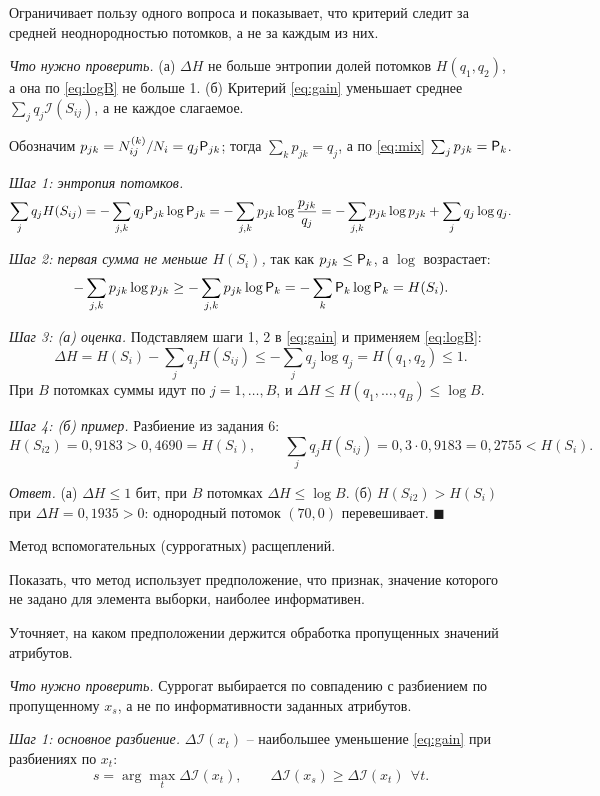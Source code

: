 \documentclass[12pt,a4paper]{article}
\begin{document}
\zachem Ограничивает пользу одного вопроса и показывает, что критерий следит за
средней неоднородностью потомков, а не за каждым из них.

\resh \emph{Что нужно проверить.} (а) $\Delta H$ не больше энтропии долей потомков
$H(q_1, q_2)$, а она по \eqref{eq:logB} не больше 1. (б) Критерий \eqref{eq:gain}
уменьшает среднее $\sum_j q_j\mathcal{I}(S_{ij})$, а не каждое слагаемое.

Обозначим $p_{jk} = N_{ij}^{(k)}/N_i = q_j\mathsf{P}_{jk}$; тогда $\sum_k p_{jk} = q_j$, а по
\eqref{eq:mix} $\sum_j p_{jk} = \mathsf{P}_k$.

\emph{Шаг 1: энтропия потомков.}
\[
  \sum_j q_jH(S_{ij}) = -\sum_{j,k} q_j\mathsf{P}_{jk}\log\mathsf{P}_{jk}
  = -\sum_{j,k} p_{jk}\log\frac{p_{jk}}{q_j}
  = -\sum_{j,k} p_{jk}\log p_{jk} + \sum_j q_j\log q_j .
\]

\emph{Шаг 2: первая сумма не меньше $H(S_i)$,} так как $p_{jk} \le \mathsf{P}_k$, а $\log$
возрастает:
\[
  -\sum_{j,k} p_{jk}\log p_{jk} \ge -\sum_{j,k} p_{jk}\log\mathsf{P}_k
  = -\sum_k \mathsf{P}_k\log\mathsf{P}_k = H(S_i) .
\]

\emph{Шаг 3: (а) оценка.} Подставляем шаги 1, 2 в \eqref{eq:gain} и применяем
\eqref{eq:logB}:
\[
  \Delta H = H(S_i) - \sum_j q_jH(S_{ij}) \le -\sum_j q_j\log q_j = H(q_1, q_2) \le 1 .
\]
При $B$ потомках суммы идут по $j = 1, \dots, B$, и
$\Delta H \le H(q_1, \dots, q_B) \le \log B$.

\emph{Шаг 4: (б) пример.} Разбиение из задания 6:
\[
  H(S_{i2}) = 0{,}9183 > 0{,}4690 = H(S_i),
  \qquad
  \sum_j q_jH(S_{ij}) = 0{,}3 \cdot 0{,}9183 = 0{,}2755 < H(S_i) .
\]

\emph{Ответ.} (а) $\Delta H \le 1$ бит, при $B$ потомках $\Delta H \le \log B$.
(б) $H(S_{i2}) > H(S_i)$ при $\Delta H = 0{,}1935 > 0$: однородный потомок $(70, 0)$
перевешивает. $\blacksquare$

\dano Метод вспомогательных (суррогатных) расщеплений.

\treb Показать, что метод использует предположение, что признак, значение
которого не задано для элемента выборки, наиболее информативен.

\zachem Уточняет, на каком предположении держится обработка пропущенных значений
атрибутов.

\resh \emph{Что нужно проверить.} Суррогат выбирается по совпадению с разбиением по
пропущенному $x_s$, а не по информативности заданных атрибутов.

\emph{Шаг 1: основное разбиение.} $\Delta\mathcal{I}(x_t)$ -- наибольшее уменьшение
\eqref{eq:gain} при разбиениях по $x_t$:
\[
  s = \arg\max_t \Delta\mathcal{I}(x_t),
  \qquad
  \Delta\mathcal{I}(x_s) \ge \Delta\mathcal{I}(x_t) \ \ \forall t .
\]
\end{document}
